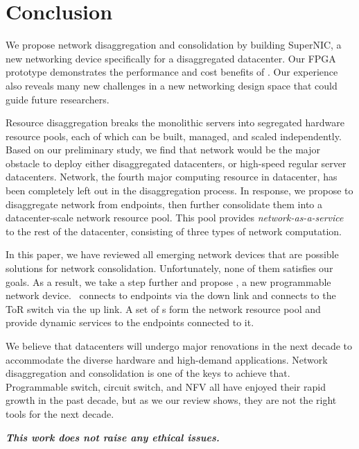 \section{Conclusion}
\label{sec:conclude}

We propose network disaggregation and consolidation by building SuperNIC, a new networking device specifically for a disaggregated datacenter.
Our FPGA prototype demonstrates the performance and cost benefits of \snic.
Our experience also reveals many new challenges in a new networking design space that could guide future researchers.

Resource disaggregation breaks the monolithic
servers into segregated hardware resource pools,
each of which can be built, managed, and scaled independently.
Based on our preliminary study,
we find that network would be the major obstacle 
to deploy either disaggregated datacenters,
or high-speed regular server datacenters.
Network, the fourth major computing resource in datacenter,
has been completely left out in the disaggregation process.
In response, we propose to disaggregate network from
endpoints, then further consolidate them into a datacenter-scale
network resource pool. This pool provides \textit{network-as-a-service}
to the rest of the datacenter, consisting of three types of network computation.

In this paper, we have reviewed all emerging network devices
that are possible solutions for network consolidation.
Unfortunately, none of them satisfies our goals.
As a result, we take a step further and propose
\sysname, a new programmable network device.
\sysname\ connects to endpoints via the down link
and connects to the ToR switch via the up link.
A set of \sysname{}s form the network resource pool
and provide dynamic services to the endpoints connected to it.

We believe that datacenters will undergo major renovations
in the next decade to accommodate the diverse hardware
and high-demand applications.
Network disaggregation and consolidation is one of the keys to achieve that.
Programmable switch, circuit switch, and NFV all have enjoyed
their rapid growth in the past decade, but as we our review shows,
they are not the right tools for the next decade.
\fi

\textbf{\textit{This work does not raise any ethical issues.}}